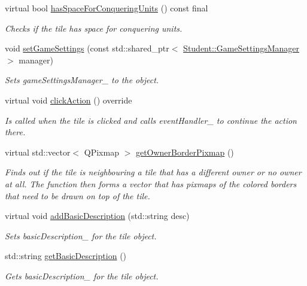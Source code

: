 \begin{DoxyCompactItemize}
virtual bool \hyperlink{class_course_1_1_tile_base_ae1dac55890d7c0b0e7e3e131857698db}{has\-Space\-For\-Conquering\-Units} () const final
\begin{DoxyCompactList}\small\item\em Checks if the tile has space for conquering units. \end{DoxyCompactList}\item 
void \hyperlink{class_course_1_1_tile_base_afad742bfab32427ebc0283c145ef3740}{set\-Game\-Settings} (const std\-::shared\-\_\-ptr$<$ \hyperlink{class_student_1_1_game_settings_manager}{Student\-::\-Game\-Settings\-Manager} $>$ manager)
\begin{DoxyCompactList}\small\item\em Sets game\-Settings\-Manager\-\_\- to the object. \end{DoxyCompactList}\item 
virtual void \hyperlink{class_course_1_1_tile_base_aff1fe4193e6d4af1a6dcb43829098a1d}{click\-Action} () override
\begin{DoxyCompactList}\small\item\em Is called when the tile is clicked and calls event\-Handler\-\_\- to continue the action there. \end{DoxyCompactList}\item 
virtual std\-::vector$<$ Q\-Pixmap $>$ \hyperlink{class_course_1_1_tile_base_a199fcbfb54f1bb1559ae59adb064d2ad}{get\-Owner\-Border\-Pixmap} ()
\begin{DoxyCompactList}\small\item\em Finds out if the tile is neighbouring a tile that has a different owner or no owner at all. The function then forms a vector that has pixmaps of the colored borders that need to be drawn on top of the tile. \end{DoxyCompactList}\item 
virtual void \hyperlink{class_course_1_1_tile_base_a5569d1215930ccd529bb511b139f04ff}{add\-Basic\-Description} (std\-::string desc)
\begin{DoxyCompactList}\small\item\em Sets basic\-Description\-\_\- for the tile object. \end{DoxyCompactList}\item 
std\-::string \hyperlink{class_course_1_1_tile_base_a945d17320cac2d8aa6a60705e3a4b930}{get\-Basic\-Description} ()
\begin{DoxyCompactList}\small\item\em Gets basic\-Description\-\_\- for the tile object. \end{DoxyCompactList}\item 

\end{DoxyCompactItemize}
